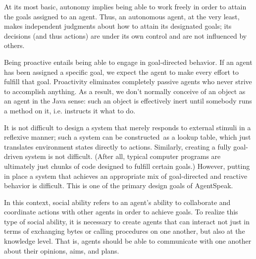 \begin{description} [style=nextline]
    \item[$\bullet$  Autonomy]
    
    At its most basic, autonomy implies being able to work freely in order to attain the goals assigned to an agent. Thus, an autonomous agent, at the very least, makes independent judgments about how to attain its designated goals; its decisions (and thus actions) are under its own control and are not influenced by others.

    \vspace{.5cm}
    
    \item[$\bullet$  Proactiveness]
    Being proactive entails being able to engage in goal-directed behavior. If an agent has been assigned a specific goal, we expect the agent to make every effort to fulfill that goal. Proactivity eliminates completely passive agents who never strive to accomplish anything. As a result, we don't normally conceive of an object as an agent in the Java sense: such an object is effectively inert until somebody runs a method on it, i.e. instructs it what to do.

    \vspace{.5cm}
    
    \item[$\bullet$  Reactivity]
    It is not difficult to design a system that merely responds to external stimuli in a reflexive manner; such a system can be constructed as a lookup table, which just translates environment states directly to actions. Similarly, creating a fully goal-driven system is not difficult. (After all, typical computer programs are ultimately just chunks of code designed to fulfill certain goals.) However, putting in place a system that achieves an appropriate mix of goal-directed and reactive behavior is difficult. This is one of the primary design goals of AgentSpeak.

    \vspace{.5cm}
    
    \item[$\bullet$  Social ability]
    In this context, social ability refers to an agent's ability to collaborate and coordinate actions with other agents in order to achieve goals. To realize this type of social ability, it is necessary to create agents that can interact not just in terms of exchanging bytes or calling procedures on one another, but also at the knowledge level. That is, agents should be able to communicate with one another about their opinions, aims, and plans.
    
    \vspace{.5cm}
    
\end{description}

